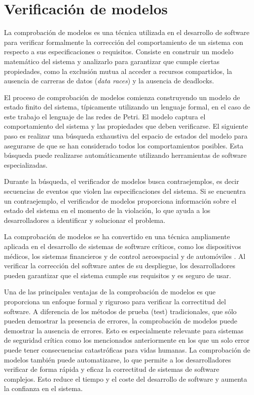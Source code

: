 \section{Verificación de modelos}

La comprobación de modelos es una técnica utilizada en el desarrollo de software para verificar
formalmente la corrección del comportamiento de un sistema con respecto a sus
especificaciones o requisitos. Consiste en construir un modelo matemático del sistema y
analizarlo para garantizar que cumple ciertas propiedades, como la exclusión mutua al acceder
a recursos compartidos, la ausencia de carreras de datos (\textit{data races}) y la ausencia de deadlocks.

El proceso de comprobación de modelos comienza construyendo un modelo de estado finito
del sistema, típicamente utilizando un lenguaje formal, en el caso de este trabajo el lenguaje de
las redes de Petri. El modelo captura el comportamiento del sistema y las propiedades que
deben verificarse. El siguiente paso es realizar una búsqueda exhaustiva del espacio de estados
del modelo para asegurarse de que se han considerado todos los comportamientos posibles.
Esta búsqueda puede realizarse automáticamente utilizando herramientas de software
especializadas.

Durante la búsqueda, el verificador de modelos busca contraejemplos, es decir secuencias de
eventos que violen las especificaciones del sistema. Si se encuentra un contraejemplo, el
verificador de modelos proporciona información sobre el estado del sistema en el momento de
la violación, lo que ayuda a los desarrolladores a identificar y solucionar el problema.

La comprobación de modelos se ha convertido en una técnica ampliamente aplicada en el
desarrollo de sistemas de software críticos, como los dispositivos médicos,
los sistemas financieros y de control aeroespacial
\cite{carreno2005safety,monzon2009deadlock} y de automóviles \cite{Perronnet2019}.
Al verificar la corrección del software antes de su despliegue,
los desarrolladores pueden garantizar que el sistema cumple sus requisitos y es seguro de usar.

Una de las principales ventajas de la comprobación de modelos es que proporciona un enfoque
formal y riguroso para verificar la correctitud del software. A diferencia de los métodos de
prueba (test) tradicionales, que sólo pueden demostrar la presencia de errores, la comprobación de
modelos puede demostrar la ausencia de errores. Esto es especialmente relevante para sistemas
de seguridad crítica como los mencionados anteriormente en los que un solo error puede tener
consecuencias catastróficas para vidas humanas. La comprobación de modelos también puede
automatizarse, lo que permite a los desarrolladores verificar de forma rápida y eficaz la
correctitud de sistemas de software complejos. Esto reduce el tiempo y el coste del desarrollo de
software y aumenta la confianza en el sistema.

